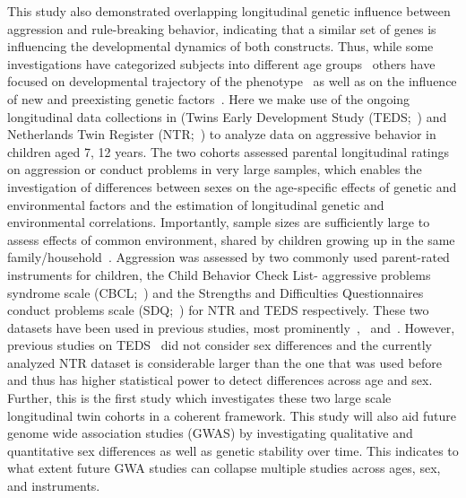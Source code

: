 This study also demonstrated overlapping longitudinal genetic influence between aggression and rule-breaking behavior, indicating that a similar set of genes is influencing the developmental dynamics of both constructs.
Thus, while some investigations have categorized subjects into different age groups~\cite{Niv2013} others have focused on developmental trajectory of the phenotype~\cite{Pingault2015} as well as on the influence of new and preexisting genetic factors~\cite{vanBeijsterveldt2003}. 
Here we make use of the ongoing longitudinal data collections in (Twins Early Development Study (TEDS;~\cite{Haworth2012}) and Netherlands Twin Register (NTR;~\cite{vanBeijsterveldt2013}) to analyze data on aggressive behavior in children aged 7, 12 years.
The two cohorts assessed parental longitudinal ratings on aggression or conduct problems in very large samples, which enables the investigation of differences between sexes on the age-specific effects of genetic and environmental factors and the estimation of longitudinal genetic and environmental correlations.
Importantly, sample sizes are sufficiently large to assess effects of common environment, shared by children growing up in the same family/household~\cite{Martin1978, Posthuma2000}. 
Aggression was assessed by two commonly used parent-rated instruments for children, the Child Behavior Check List- aggressive problems syndrome scale (CBCL;~\cite{Achenbach2010}) and the Strengths and Difficulties Questionnaires conduct problems scale (SDQ;~\cite{Goodman2001}) for NTR and TEDS respectively. 
These two datasets have been used in previous studies, most prominently~\citet{Lewis2015},~\citet{Pingault2015} and~\citet{vanBeijsterveldt2003}.
However, previous studies on TEDS~\cite{Lewis2015, Pingault2015} did not consider sex differences and the currently analyzed NTR dataset is considerable larger than the one that was used before~\cite{vanBeijsterveldt2003} and thus has higher statistical power to detect differences across age and sex.
Further, this is the first study which investigates these two large scale longitudinal twin cohorts in a coherent framework.
This study will also aid future genome wide association studies (GWAS) by investigating qualitative and quantitative sex differences as well as genetic stability over time.
This indicates to what extent future GWA studies can collapse multiple studies across ages, sex, and instruments.
